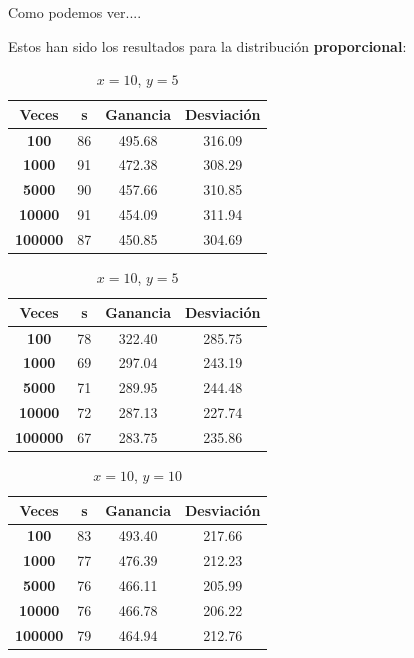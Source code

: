 \documentclass[11pt,a4paper]{report}
\begin{document}
Como podemos ver....

Estos han sido los resultados para la distribución \textbf{proporcional}:

\begin{table}[H]
	\parbox{.45\linewidth}{
	\centering
	\begin{tabular}{c|ccc}
	\textbf{Veces} & \textbf{s} & \textbf{Ganancia} & \textbf{Desviación} \\ \hline
	\textbf{100}   & 86         & 495.68            & 316.09			  \\ \hline
	\textbf{1000}  & 91         & 472.38            & 308.29			  \\ \hline
	\textbf{5000}  & 90         & 457.66            & 310.85 			  \\ \hline
	\textbf{10000} & 91         & 454.09            & 311.94			  \\ \hline
	\textbf{100000}& 87         & 450.85            & 304.69			  \\
	\end{tabular}
	\caption{$x=10$, $y=1$}
	}
	\hfill
	\parbox{.45\linewidth}{
	\centering
	\begin{tabular}{c|ccc}
	\textbf{Veces} & \textbf{s} & \textbf{Ganancia} & \textbf{Desviación} \\ \hline
	\textbf{100}   & 78         & 322.40            & 285.75			  \\ \hline
	\textbf{1000}  & 69         & 297.04            & 243.19			  \\ \hline
	\textbf{5000}  & 71         & 289.95            & 244.48 			  \\ \hline
	\textbf{10000} & 72         & 287.13            & 227.74			  \\ \hline
	\textbf{100000}& 67         & 283.75            & 235.86			  \\
	\end{tabular}
	\caption{$x=10$, $y=5$}
	}
\end{table}
\begin{table}[H]
	\centering
	\begin{tabular}{c|ccc}
	\textbf{Veces} & \textbf{s} & \textbf{Ganancia} & \textbf{Desviación} \\ \hline
	\textbf{100}   & 83         & 493.40            & 217.66			  \\ \hline
	\textbf{1000}  & 77         & 476.39            & 212.23			  \\ \hline
	\textbf{5000}  & 76         & 466.11            & 205.99 			  \\ \hline
	\textbf{10000} & 76         & 466.78            & 206.22			  \\ \hline
	\textbf{100000}& 79         & 464.94            & 212.76			  \\
	\end{tabular}
	\caption{$x=10$, $y=10$}
\end{table}
\end{document}
